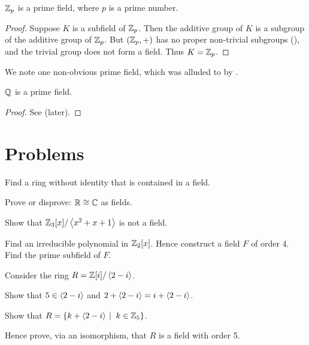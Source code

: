 \begin{theorem}
    $\mathbb{Z}_p$ is a prime field, where $p$ is a prime number.
\end{theorem}
\begin{proof}
    Suppose $K$ is a subfield of $\mathbb{Z}_p$. Then the additive group of $K$ is a subgroup of the additive group of $\mathbb{Z}_p$. But $(\mathbb{Z}_p, +)$ has no proper non-trivial subgroups (), and the trivial group does not form a field. Thus $K = \mathbb{Z}_p$.
\end{proof}

We note one non-obvious prime field, which was alluded to by .

\begin{theorem}\label{thrm-Q-is-prime-field}
    $\mathbb{Q}$ is a prime field.
\end{theorem}
\begin{proof}
    See  (later).
\end{proof}



\section{Problems}
\begin{problem}
    Find a ring without identity that is contained in a field.
\end{problem}

\begin{problem}
    Prove or disprove: $\mathbb{R} \cong \mathbb{C}$ as fields.
\end{problem}

\begin{problem}
    Show that $\mathbb{Z}_3[x]/\left\langle x^2+x+1\right\rangle$ is not a field.
\end{problem}

\begin{problem}
    Find an irreducible polynomial in $\mathbb{Z}_2[x]$. Hence construct a field $F$ of order 4. Find the prime subfield of $F$.
\end{problem}

\begin{problem}
    Consider the ring $R = \mathbb{Z}[i] / \left\langle2-i\right\rangle$.
    \begin{partquestions}{\roman*}
        \item Show that $5 \in \left\langle2-i\right\rangle$ and $2 + \left\langle2-i\right\rangle = i + \left\langle2-i\right\rangle$.
        \item Show that $R = \{k + \princ{2-i} \vert k \in \Z_5\}$.
        \item Hence prove, via an isomorphism, that $R$ is a field with order 5.
    \end{partquestions}
\end{problem}


